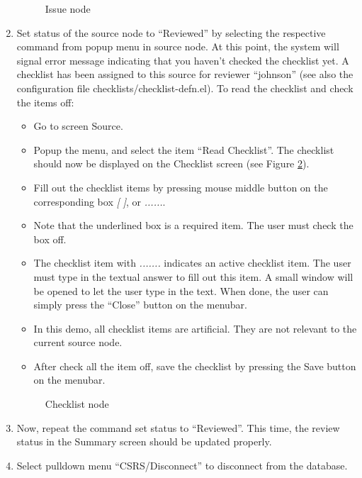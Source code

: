\begin{enumerate}
\begin{figure}[htb]
  {\centerline{}}
  \caption{Issue node}
  \label{issue}
\end{figure}
   
\item Set status of the source node to ``Reviewed'' by selecting the
respective command from popup menu in source node.
At this point, the system will signal error message indicating that
you haven't checked the checklist yet. A checklist has been assigned to
this source for reviewer ``johnson'' (see also the configuration file
checklists/checklist-defn.el). 
To read the checklist and check the items off:
   \begin{itemize}
      \item Go to screen Source.
      \item Popup the menu, and select the item ``Read Checklist''.
            The checklist should now be displayed on the Checklist
            screen (see Figure \ref{checklist}).
      \item Fill out the checklist items by pressing mouse middle
      button on the corresponding box {\it [ ]}, or {\it ......}. 
      \item Note that the underlined box is a required item. The user
      must check the box off.
      \item The checklist item with {\it .......} indicates an active
      checklist item. The user must type in the textual answer to fill
      out this item. A small window will be opened 
      to let the user type in the text. When done, the user can simply
      press the ``Close'' button on the menubar.
      \item In this demo, all checklist items are artificial. They
       are not relevant to the current source node.
      \item After check all the item off, save the checklist by
      pressing the Save button on the menubar.
  \end{itemize}

\begin{figure}[htb]
  {\centerline{}}
  \caption{Checklist node}
  \label{checklist}
\end{figure}

\item Now, repeat the command set status to ``Reviewed''. This time,
the review status in the Summary screen should be updated properly.
\item Select pulldown menu ``CSRS/Disconnect'' to disconnect from the
database. 
\end{enumerate}

